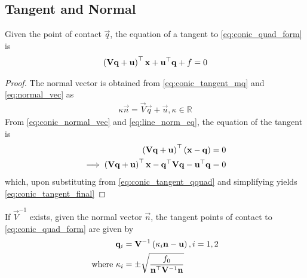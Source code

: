 \documentclass[journal,12pt,onecolumn]{IEEEtran}
\begin{document}
\subsection{ Tangent and Normal}
\begin{theorem}[Tangent]
  Given the point of contact $\vec{q}$, the equation of a tangent to \eqref{eq:conic_quad_form} is 
  \begin{align}
  \left(\mathbf{V}\mathbf{q}+\mathbf{u}\right)^{\top}\mathbf{x}+\mathbf{u}^{\top}\mathbf{q}+f = 0
  \label{eq:conic_tangent_final}
  \end{align}
\end{theorem}
\begin{proof}
  The normal vector is obtained from \eqref{eq:conic_tangent_mq} and \eqref{eq:normal_vec}
  as
  \begin{align}
  \label{eq:conic_normal_vec}
	  \kappa \vec{n} = \vec{V}\vec{q}+\vec{u}, \kappa \in \mathbb{R}
  \end{align}  
  From \eqref{eq:conic_normal_vec} and \eqref{eq:line_norm_eq}, the equation of the tangent is\begin{align}
    \left(\mathbf{V}\mathbf{q}+\mathbf{u}\right)^{\top}\left(\mathbf{x}-\mathbf{q}\right) &=0
    \\
    \implies \left(\mathbf{V}\mathbf{q}+\mathbf{u}\right)^{\top}\mathbf{x}-\mathbf{q}^{\top}\mathbf{V}\mathbf{q}-\mathbf{u}^{\top}\mathbf{q} &= 0
    \end{align}
    which, upon substituting from \eqref{eq:conic_tangent_qquad} and simplifying yields 
  \eqref{eq:conic_tangent_final}
\end{proof}
\begin{theorem}
  If $\vec{V}^{-1}$ exists, given the normal vector $\vec{n}$, the tangent points of contact to \eqref{eq:conic_quad_form} are given by
\begin{align}
  \begin{split}
\mathbf{q}_i &= \mathbf{V}^{-1}\left(\kappa_i \mathbf{n}-\mathbf{u}\right), i = 1,2
\\
\text{where }\kappa_i &= \pm \sqrt{
\frac{
f_0
}
{
\mathbf{n}^{\top}\mathbf{V}^{-1}\mathbf{n}
}
}
  \end{split}
\label{eq:conic_tangent_qk}
\end{align}
\end{theorem}
\end{document}
